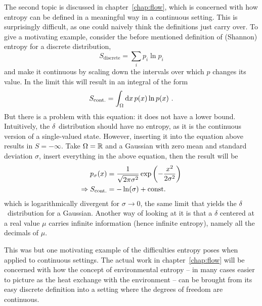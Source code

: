 The second topic is discussed in chapter~\ref{chap:flow}, which is concerned with how entropy can be defined in a meaningful way in a continuous setting. This is surprisingly difficult, as one could naively think the definitions just carry over. To give a motivating example, consider the before mentioned definition of (Shannon) entropy for a discrete distribution,
%
\begin{equation}
	S_\text{discrete} = \sum_ip_i\ln p_i
\end{equation}
%
and make it continuous by scaling down the intervals over which \(p\) changes its value. In the limit this will result in an integral of the form
%
\begin{equation}
	S_\text{cont.} = \int_\Omega\mathrm{d} x\,p(x)\ln p(x) ~.
\end{equation}
%
But there is a problem with this equation: it does not have a lower bound. Intuitively, the \(\delta\)~distribution should have no entropy, as it is the continuous version of a single-valued state. However, inserting it into the equation above results in \(S = -\infty\). Take \(\Omega = \mathbb{R}\) and a Gaussian with zero mean and standard deviation \(\sigma\), insert everything in the above equation, then the result will be
%
\begin{align}
	p_\sigma(x) &= \frac1{\sqrt{2\pi\sigma^2}} \operatorname{exp}\left(-\frac{x^2}{2\sigma^2}\right) \\
	\Rightarrow S_\text{cont.} &= -\ln(\sigma) + \mathrm{const.}
\end{align}
%
which is logarithmically divergent for \(\sigma\to0\), the same limit that yields the \(\delta\)~distribution for a Gaussian. Another way of looking at it is that a \(\delta\) centered at a real value \(\mu\) carries infinite information (hence infinite entropy), namely all the decimals of \(\mu\).

This was but one motivating example of the difficulties entropy poses when applied to continuous settings. The actual work in chapter~\ref{chap:flow} will be concerned with how the concept of environmental entropy -- in many cases easier to picture as the heat exchange with the environment -- can be brought from its easy discrete definition into a setting where the degrees of freedom are continuous.




